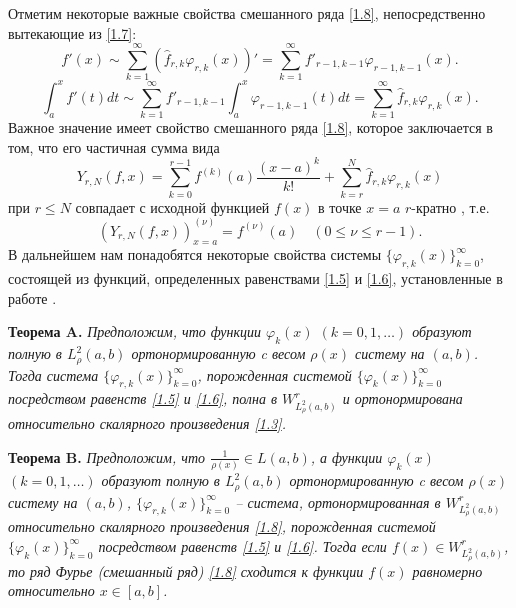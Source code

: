 Отметим некоторые важные свойства смешанного ряда \eqref{1.8}, непосредственно вытекающие из \eqref{1.7}:
\begin{equation}\label{2.1}
f'(x)\sim \sum_{k=1}^\infty (\hat f_{r,k}\varphi_{r,k}(x))'= \sum_{k=1}^\infty f'_{r-1,k-1}\varphi_{r-1,k-1}(x).
\end{equation}
\begin{equation}\label{2.2}
\int_a^xf'(t)dt\sim \sum_{k=1}^\infty f'_{r-1,k-1}\int_a^x\varphi_{r-1,k-1}(t)dt=\sum_{k=1}^\infty \hat f_{r,k}\varphi_{r,k}(x).
\end{equation}
Важное значение имеет свойство  смешанного ряда \eqref{1.8}, которое заключается в том, что его частичная сумма вида
\begin{equation}\label{2.3}
Y_{r,N}(f,x)=\sum_{k=0}^{r-1} f^{(k)}(a)\frac{(x-a)^k}{k!}+ \sum_{k=r}^{N} \hat f_{r,k}\varphi_{r,k}(x)
\end{equation}
 при   $r\le N$  совпадает с исходной функцией $f(x)$   в точке $x=a$ $r$-кратно , т.е.
\begin{equation}\label{2.4}
(Y_{r,N}(f,x))^{(\nu)}_{x=a}=f^{(\nu)}(a)\quad (0\le\nu\le r-1).
\end{equation}
 В дальнейшем нам понадобятся  некоторые  свойства системы $\{\varphi_{r,k}(x)\}_{k=0}^\infty$, состоящей из функций, определенных равенствами   \eqref{1.5} и \eqref{1.6}, установленные в работе \cite{Shar20}.

 \textbf{ Теорема A.} \textit{  Предположим, что    функции $\varphi_k(x)$ $(k=0,1,\ldots)$ образуют полную в $L^2_\rho(a,b)$ ортонормированную   c весом   $\rho(x)$ систему на  $(a,b)$. Тогда система $\{\varphi_{r,k}(x)\}_{k=0}^\infty$, порожденная системой $\{\varphi_{k}(x)\}_{k=0}^\infty$ посредством равенств \eqref{1.5} и \eqref{1.6}, полна  в $W^r_{L^2_\rho(a,b)}$ и ортонормирована относительно скалярного произведения \eqref{1.3}.}


\textbf{ Теорема B.} \textit{
Предположим, что  $ \frac{1}{\rho(x)}\in L(a,b) $, а  функции $\varphi_k(x)$ $(k=0,1,\ldots)$  образуют полную в $L^2_\rho(a,b)$ ортонормированную   c весом   $\rho(x)$ систему на $(a,b)$, $\{\varphi_{r,k}(x)\}_{k=0}^\infty$ -- система, ортонормированная в $W^r_{L^2_\rho(a,b)}$ относительно скалярного произведения \eqref{1.8},  порожденная системой $\{\varphi_{k}(x)\}_{k=0}^\infty$ посредством равенств \eqref{1.5} и \eqref{1.6}.
Тогда если $f(x)\in W^r_{L^2_\rho(a,b)}$, то ряд Фурье (смешанный ряд) \eqref{1.8} сходится к функции $f(x)$ равномерно относительно $x\in[a,b]$.}
\vskip 0.2cm



